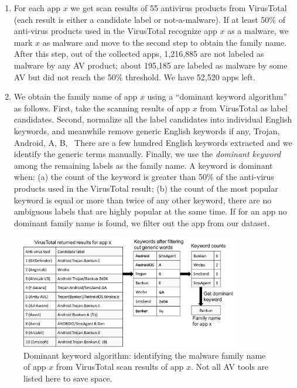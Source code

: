 \begin{enumerate}[label=\alph*)]
\item For each app $x$ we get scan results of 55 antivirus products from VirusTotal (each result is either a candidate label or not-a-malware).
If at least 50\% of anti-virus products used in the VirusTotal recognize app $x$ as a malware, 
we mark $x$ as malware and move to the second step to obtain the family name.
After this step, out of the collected apps, 1,216,885 are not labeled as malware by any AV
product; about 195,185 are labeled as malware by some AV but did not reach the 50\% threshold.
We have 52,520 apps left.
\item We obtain the family name of app $x$ using a ``dominant keyword algorithm''
as follows.
First, take the scanning results of app $x$ from VirusTotal as label candidates.
Second, normalize all the label candidates into individual English keywords,
and meanwhile remove generic English keywords if any, \eg Trojan, Android, A, B,~\etc
There are a few hundred English keywords extracted and we identify the generic terms manually.
Finally, we use the \emph{dominant keyword} among the remaining labels as the family name.
A keyword is dominant when: 
(a) the count of the keyword is greater than 50\% of the anti-virus products used in the VirusTotal result; 
(b) the count of the most popular keyword is equal or more than twice of any other keyword, 
\ie there are no ambiguous labels that are highly popular at the same time.
If for an app no dominant family name is found, we filter out the app from our dataset.
\end{enumerate}


\begin{figure}[t]
\centering
\includegraphics[width=3.8in]{fig/dominant.png}
\caption{Dominant keyword algorithm: identifying the malware family name of app $x$ from VirusTotal scan results of app $x$. Not all AV tools are listed here to save space.}
 \label{fig:dominant}
\end{figure}

